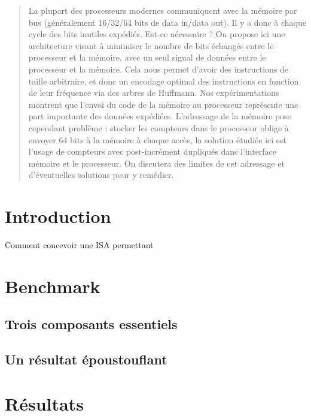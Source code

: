\documentclass[architecture]{compas2018}
\begin{document}
\title{}
\shorttitle{}

\author{Florent de Dinechin}%

\address{École Normale Supérieure de Lyon,\\
 - 46 allée d'Italie\\
69008 - France\\
Vincent.Danjean@imag.fr}

\date{\today}

\maketitle

\begin{abstract}
  La plupart des processeurs modernes communiquent avec la mémoire par bus (généralement 16/32/64 bits de data in/data out). Il y a donc à chaque cycle des bits inutiles expédiés. Est-ce nécessaire ?
On propose ici une architecture visant à minimiser le nombre de bits échangés entre le processeur et la mémoire, avec un seul signal de données entre le processeur et la mémoire. Cela nous permet d'avoir des instructions de taille arbitraire, et donc un encodage optimal des instructions en fonction de leur fréquence via des arbres de Huffmann. Nos expérimentations montrent que l'envoi du code de la mémoire au processeur représente une part importante des données expédiées.
L'adressage de la mémoire pose cependant problème : stocker les compteurs dans le processeur oblige à envoyer 64 bits à la mémoire à chaque accès, la solution étudiée ici est l'usage de compteurs avec post-incrément dupliqués dans l'interface mémoire et le processeur. On discutera des limites de cet adressage et d'éventuelles solutions pour y remédier. 
\end{abstract}


\section{Introduction}

Comment concevoir une ISA permettant 

\section{Benchmark}

\subsection{Trois composants essentiels}

\subsection{Un résultat époustouflant}

\section{Résultats}
\end{document}
